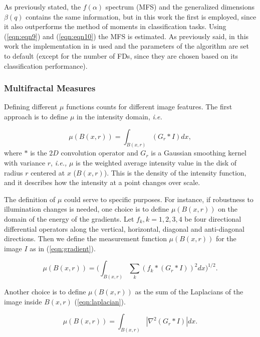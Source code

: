 \documentclass[a4paper,10pt]{article}
\begin{document}
As previously stated, the $f(\alpha)$ spectrum (MFS) and the generalized dimensions $\beta(q)$ contains the same information, but in this work the first is employed, since it also outperforms the method of moments in classification tasks. Using (\ref{eqn:eqn9}) and (\ref{eqn:eqn10}) the MFS is estimated. As previously said, in this work the implementation in \cite{Xu2006} is used and the parameters of the algorithm are set to default (except for the number of FDs, since they are chosen based on its classification performance).


\subsubsection{Multifractal Measures}
Defining different $\mu$ functions counts for different image features. The first approach is to define $\mu$ in the intensity domain, {\em i.e.}

\begin{equation}
\mu(B(x,r)) = \int_{B(x,r)}{(G_{r} \ast I)} dx,
\label{eqn:eqn11}
\end{equation}
where $\ast$ is the $2D$ convolution operator and $G_{r}$ is a Gaussian smoothing kernel with variance $r$, {\em i.e., } $\mu$ is the weighted average intensity value in the disk of radius $r$ centered at $x$ ($B(x,r)$). This is the density of the intensity function, and it describes how the intensity at a point changes over scale.

The definition of $\mu$ could serve to specific purposes. For instance, if robustness to illumination changes is needed, one choice is to define $\mu(B(x,r))$ on the domain of the energy of the gradients. Let ${ f_{k} , k = 1, 2, 3, 4}$ be four directional differential operators along the vertical, horizontal, diagonal and anti-diagonal directions. Then we define the measurement function $\mu(B(x,r))$ for the image $I$ as in (\ref{eqn:gradient}).

\begin{equation}
\mu(B(x,r)) = (\int_{B(x,r)}{\sum_{k}{(f_{k} \ast (G_{r} \ast I))^{2}} dx)^{1/2}}.
\label{eqn:gradient}
\end{equation}

Another choice is to define $μ(B(x, r))$ as the sum of the Laplacians of the image inside $B(x, r)$ (\ref{eqn:laplacian}).

\begin{equation}
\mu(B(x,r)) = \int_{B(x,r)}|\nabla^2 (G_{r} \ast I)| dx.
\label{eqn:laplacian}
\end{equation}
\end{document}
